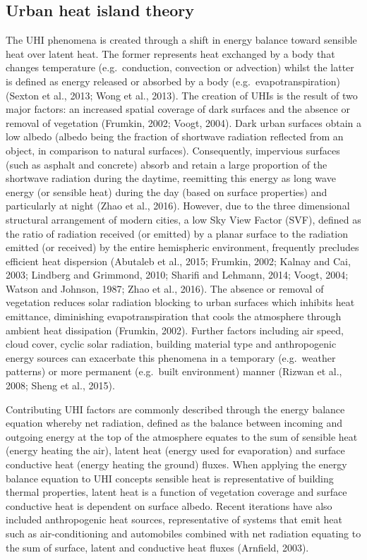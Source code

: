 \documentclass[]{book}
\begin{document}
\subsection{Urban heat island theory}\label{urban-heat-island-theory}

The UHI phenomena is created through a shift in energy balance toward
sensible heat over latent heat. The former represents heat exchanged by
a body that changes temperature (e.g.~conduction, convection or
advection) whilst the latter is defined as energy released or absorbed
by a body (e.g.~evapotranspiration) (Sexton et al., 2013; Wong et al.,
2013). The creation of UHIs is the result of two major factors: an
increased spatial coverage of dark surfaces and the absence or removal
of vegetation (Frumkin, 2002; Voogt, 2004). Dark urban surfaces obtain a
low albedo (albedo being the fraction of shortwave radiation reflected
from an object, in comparison to natural surfaces). Consequently,
impervious surfaces (such as asphalt and concrete) absorb and retain a
large proportion of the shortwave radiation during the daytime,
reemitting this energy as long wave energy (or sensible heat) during the
day (based on surface properties) and particularly at night (Zhao et
al., 2016). However, due to the three dimensional structural arrangement
of modern cities, a low Sky View Factor (SVF), defined as the ratio of
radiation received (or emitted) by a planar surface to the radiation
emitted (or received) by the entire hemispheric environment, frequently
precludes efficient heat dispersion (Abutaleb et al., 2015; Frumkin,
2002; Kalnay and Cai, 2003; Lindberg and Grimmond, 2010; Sharifi and
Lehmann, 2014; Voogt, 2004; Watson and Johnson, 1987; Zhao et al.,
2016). The absence or removal of vegetation reduces solar radiation
blocking to urban surfaces which inhibits heat emittance, diminishing
evapotranspiration that cools the atmosphere through ambient heat
dissipation (Frumkin, 2002). Further factors including air speed, cloud
cover, cyclic solar radiation, building material type and anthropogenic
energy sources can exacerbate this phenomena in a temporary
(e.g.~weather patterns) or more permanent (e.g.~built environment)
manner (Rizwan et al., 2008; Sheng et al., 2015).

Contributing UHI factors are commonly described through the energy
balance equation whereby net radiation, defined as the balance between
incoming and outgoing energy at the top of the atmosphere equates to the
sum of sensible heat (energy heating the air), latent heat (energy used
for evaporation) and surface conductive heat (energy heating the ground)
fluxes. When applying the energy balance equation to UHI concepts
sensible heat is representative of building thermal properties, latent
heat is a function of vegetation coverage and surface conductive heat is
dependent on surface albedo. Recent iterations have also included
anthropogenic heat sources, representative of systems that emit heat
such as air-conditioning and automobiles combined with net radiation
equating to the sum of surface, latent and conductive heat fluxes
(Arnfield, 2003).
\end{document}
